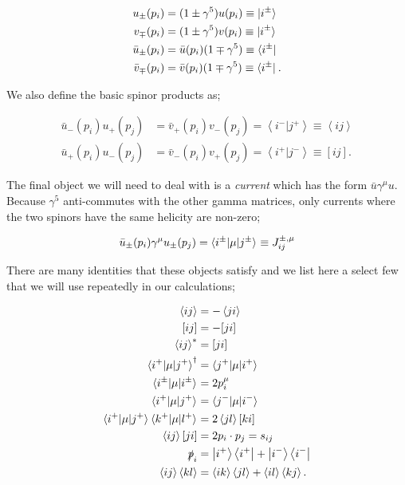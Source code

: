 \begin{subequations}
\begin{align}
u_{\pm}(p_i) &= (1 \pm \gamma^5)u(p_i) \equiv \mathinner{\lvert i^\pm\rangle}_{\hspace{-0.1em}}\\
v_{\mp}(p_i) &= (1 \pm \gamma^5)v(p_i) \equiv \mathinner{\lvert i^\pm\rangle}_{\hspace{-0.1em}}\\
\bar{u}_{\pm}(p_i) &= \bar{u}(p_i) (1 \mp \gamma^5) \equiv \mathinner{\langle i^\pm\rvert}_{}\\
\bar{v}_{\mp}(p_i) &= \bar{v}(p_i) (1 \mp \gamma^5) \equiv \mathinner{\langle i^\pm\rvert}_{}.
\end{align}
\end{subequations}

We also define the basic spinor products as;

\begin{subequations}
\begin{align}
\bar{u}_-(p_i)u_+(p_j) &= \bar{v}_+(p_i)v_-(p_j) = \left<i^- | j^+ \right> \equiv \left< i j \right> \\
\bar{u}_+(p_i)u_-(p_j) &= \bar{v}_-(p_i)v_+(p_j) = \left<i^+ | j^- \right> \equiv \left[ i j \right].
\end{align}
\end{subequations}

The final object we will need to deal with is a \emph{current} which has the form $\bar{u} \gamma^\mu u$. Because $\gamma^5$ anti-commutes with the other gamma matrices, only currents where the two spinors have the same helicity are non-zero;

\begin{equation}
\bar{u}_{\pm}(p_i) \gamma^\mu u_{\pm}(p_j) = \mathinner{\langle i^\pm\vert\mu\vert j^\pm\rangle}_{} \equiv J_{ij}^{\pm, \mu}
\end{equation}

There are many identities that these objects satisfy \cite{Dixon1996} and we list here a select few that we will use repeatedly in our calculations;

\begin{subequations}
\begin{align}
\left<i j \right> &= - \left<j i \right> \\
[i j] &= - [ji] \\
\left< i j \right>^* &= [j i ] \\
\mathinner{\langle i^+\vert\mu\vert j^+\rangle}_{}^\dagger &= \mathinner{\langle j^+\vert\mu\vert i^+\rangle}_{} \\
\mathinner{\langle i^\pm\vert\mu\vert i^\pm\rangle}_{} &= 2p_i^\mu \\
\mathinner{\langle i^+\vert\mu\vert j^+\rangle}_{} &= \mathinner{\langle j^-\vert\mu\vert i^-\rangle}_{} \\
\mathinner{\langle i^+\vert\mu\vert j^+\rangle}_{} \mathinner{\langle k^+\vert\mu\vert l^+\rangle}_{} &= 2 \left<j l \right> \left[k i \right] \\
 \left<i j \right> [ji] &= 2 p_i \cdot p_j = s_{ij} \\
\slashed{p}_i&= \left| i^+ \right> \left<i^+ \right| + \left|i^- \right> \left <i^- \right| \\
\left< i j \right> \left< k l \right> &= \left<i k \right> \left< j l \right> + \left< i l \right> \left< k j \right>.
\end{align}
\end{subequations}

